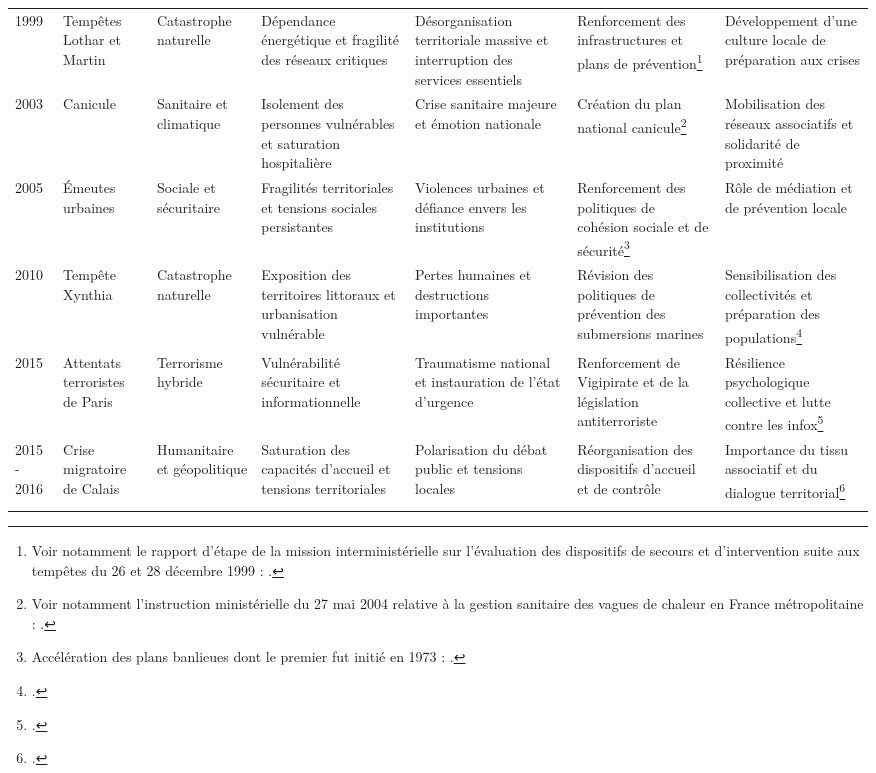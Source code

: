 \begin{xltabular}{\linewidth}{@{}
L{1.1cm}
L{2.35cm}
L{2.25cm}
Z
Z
Z
Z
@{}}
1999 &
Tempêtes Lothar et Martin &
Catastrophe naturelle &
Dépendance énergétique et fragilité des réseaux critiques &
Désorganisation territoriale massive et interruption des services essentiels &
Renforcement des infrastructures et plans de prévention\footnote{Voir notamment le rapport d'étape de la mission interministérielle sur l'évaluation des dispositifs de secours et d'intervention suite aux tempêtes du 26 et 28 décembre 1999 : \cite{renforcement_dispositif_prevention_1999}.} &
Développement d'une culture locale de préparation aux crises \\
\addlinespace

2003 &
Canicule &
Sanitaire et climatique &
Isolement des personnes vulnérables et saturation hospitalière &
Crise sanitaire majeure et émotion nationale &
Création du plan national canicule\footnote{Voir notamment l'instruction ministérielle du 27 mai 2004 relative à la gestion sanitaire des vagues de chaleur en France métropolitaine : \cite{gestion_sanitaire_des_vagues_de_chaleur_2004}.} &
Mobilisation des réseaux associatifs et solidarité de proximité \\
\addlinespace

2005 &
Émeutes urbaines &
Sociale et sécuritaire &
Fragilités territoriales et tensions sociales persistantes &
Violences urbaines et défiance envers les institutions &
Renforcement des politiques de cohésion sociale et de sécurité\footnote{Accélération des plans banlieues dont le premier fut initié en 1973 : \cite{Le_Monde_plans_banlieue}.} &
Rôle de médiation et de prévention locale \\
\addlinespace

2010 &
Tempête Xynthia &
Catastrophe naturelle &
Exposition des territoires littoraux et urbanisation vulnérable &
Pertes humaines et destructions importantes &
Révision des politiques de prévention des submersions marines &
Sensibilisation des collectivités et préparation des populations\footnote{\cite{Senat:2015:Xynthia}.} \\
\addlinespace

2015 &
Attentats terroristes de Paris &
Terrorisme hybride &
Vulnérabilité sécuritaire et informationnelle &
Traumatisme national et instauration de l'état d'urgence &
Renforcement de Vigipirate et de la législation antiterroriste &
Résilience psychologique collective et lutte contre les infox\footnote{\cite{AN:2016:Lutte_terrorisme}.} \\
\addlinespace

2015 - 2016 &
Crise migratoire de Calais &
Humanitaire et géopolitique &
Saturation des capacités d'accueil et tensions territoriales &
Polarisation du débat public et tensions locales &
Réorganisation des dispositifs d'accueil et de contrôle &
Importance du tissu associatif et du dialogue territorial\footnote{\cite{AN:2021:Migration}.} \\
\addlinespace


\end{xltabular}
